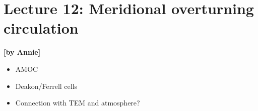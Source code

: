 
\section{Lecture 12: Meridional overturning circulation}\label{sec:lecture12}
\begin{flushright}\textbf{[by Annie]}\end{flushright}
  
 \begin{itemize}
   \item
   AMOC
   \item
   Deakon/Ferrell cells
   \item
   Connection with TEM and atmosphere?
 \end{itemize}
